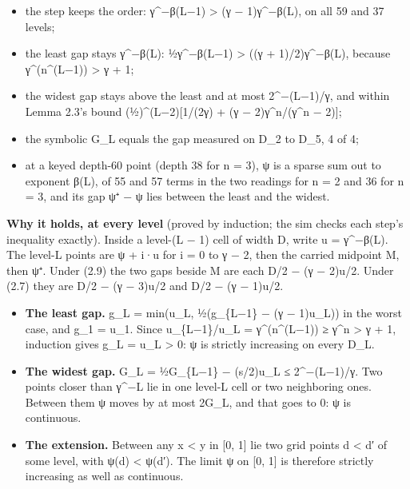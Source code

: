 \begin{enumerate}
\begin{itemize}
\item the step keeps the order: γ\textasciicircum{}−β(L−1) > (γ − 1)γ\textasciicircum{}−β(L), on all 59 and 37 levels;
\item the least gap stays γ\textasciicircum{}−β(L): ½γ\textasciicircum{}−β(L−1) > ((γ + 1)/2)γ\textasciicircum{}−β(L), because γ\textasciicircum{}(n\textasciicircum{}(L−1)) > γ + 1;
\item the widest gap stays above the least and at most 2\textasciicircum{}−(L−1)/γ, and within Lemma 2.3's bound (½)\textasciicircum{}(L−2)[1/(2γ) + (γ − 2)γ\textasciicircum{}n/(γ\textasciicircum{}n − 2)];
\item the symbolic G\_\allowbreak{}L equals the gap measured on D\_\allowbreak{}2 to D\_\allowbreak{}5, 4 of 4;
\item at a keyed depth-60 point (depth 38 for n = 3), ψ is a sparse sum out to exponent β(L), of 55 and 57 terms in the two readings for n = 2 and 36 for n = 3, and its gap ψ⁺ − ψ lies between the least and the widest.
\end{itemize}
\end{enumerate}

\textbf{Why it holds, at every level} (proved by induction; the sim checks each step's inequality exactly). Inside a level-(L − 1) cell of width D, write u = γ\textasciicircum{}−β(L). The level-L points are ψ + i·u for i = 0 to γ − 2, then the carried midpoint M, then ψ⁺. Under (2.9) the two gaps beside M are each D/2 − (γ − 2)u/2. Under (2.7) they are D/2 − (γ − 3)u/2 and D/2 − (γ − 1)u/2.

\begin{itemize}
\item \textbf{The least gap.} g\_\allowbreak{}L = min(u\_\allowbreak{}L, ½(g\_\allowbreak{}\{L−1\} − (γ − 1)u\_\allowbreak{}L)) in the worst case, and g\_\allowbreak{}1 = u\_\allowbreak{}1. Since u\_\allowbreak{}\{L−1\}/u\_\allowbreak{}L = γ\textasciicircum{}(n\textasciicircum{}(L−1)) ≥ γ\textasciicircum{}n > γ + 1, induction gives g\_\allowbreak{}L = u\_\allowbreak{}L > 0: ψ is strictly increasing on every D\_\allowbreak{}L.
\item \textbf{The widest gap.} G\_\allowbreak{}L = ½G\_\allowbreak{}\{L−1\} − (s/2)u\_\allowbreak{}L ≤ 2\textasciicircum{}−(L−1)/γ. Two points closer than γ\textasciicircum{}−L lie in one level-L cell or two neighboring ones. Between them ψ moves by at most 2G\_\allowbreak{}L, and that goes to 0: ψ is continuous.
\item \textbf{The extension.} Between any x < y in [0, 1] lie two grid points d < d′ of some level, with ψ(d) < ψ(d′). The limit ψ on [0, 1] is therefore strictly increasing as well as continuous.
\end{itemize}

